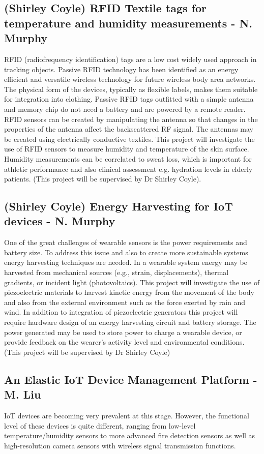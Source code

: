 \documentclass[a4paper]{article}
\begin{document}
\subsection{(Shirley Coyle) RFID Textile tags for temperature and humidity
measurements - N. Murphy}

RFID (radiofrequency identification) tags are a low cost widely used approach in tracking objects. Passive RFID technology has been identified as an energy efficient and versatile wireless technology for future wireless body area networks. The physical form of the devices, typically as flexible labels, makes them suitable for integration into clothing. Passive RFID tags outfitted with a simple antenna and memory chip do not need a battery and are powered by a remote reader. RFID sensors can be created by manipulating the antenna so that changes in the properties of the antenna affect the backscattered RF signal. The antennas may be created using electrically conductive textiles. This project will investigate the use of RFID sensors to measure humidity and temperature of the skin surface. Humidity measurements can be correlated to sweat loss, which is important for athletic performance and also clinical assessment e.g. hydration levels in elderly patients. (This project will be  supervised by Dr Shirley Coyle).

\subsection{ (Shirley Coyle) Energy Harvesting for IoT devices - N. Murphy}
One of the great challenges of wearable sensors is the power requirements and battery size. To address this issue and also to create more sustainable systems energy harvesting techniques are needed. In a wearable system energy may be harvested from mechanical sources (e.g., strain, displacements), thermal gradients, or incident light (photovoltaics). This project will investigate the use of piezoelectric materials to harvest kinetic energy from the movement of the body and also from the external environment such as the force exerted by rain and wind. In addition to integration of piezoelectric generators this project will require hardware design of an energy harvesting circuit and battery storage. The power generated may be used to store power to charge a wearable device, or provide feedback on the wearer’s activity level and environmental conditions. (This project will be supervised by Dr Shirley Coyle)

\subsection{An Elastic IoT Device Management Platform - M. Liu}
IoT devices are becoming very prevalent at this stage. However, the functional level of these devices is quite different, ranging from low-level temperature/humidity sensors to more advanced fire detection sensors as well as high-resolution camera sensors with wireless signal transmission functions.
\end{document}

